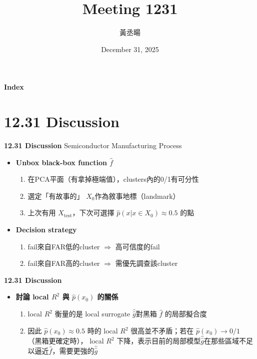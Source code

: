 \documentclass[12pt,aspectratio=43]{beamer}
\title{Meeting 1231}
\author{黃丞暘}
\institute{國立東華大學應數統計所}
\date{December 31, 2025}
\begin{document}
\begin{frame}
  \titlepage
\end{frame}

\begin{frame}{\textbf{Index}}
  \tableofcontents
\end{frame}

\section{12.31 Discussion}

\begin{frame}{\textbf{12.31 Discussion}}
\linespread{1.5}
Semiconductor Manufacturing Process

  \begin{itemize}
    \item \textbf{Unbox black-box function $\hat f$}
    \begin{enumerate}[]
      \item 在PCA平面（有拿掉極端值），clusters內的0/1有可分性  
      \item 選定「有故事的」 $X_0$作為敘事地標（landmark）
      \item 上次有用 $X_{\text{test}}$，下次可選擇 $\hat p(x|x \in X_0)\approx 0.5$ 的點
    \end{enumerate}

    \item \textbf{Decision strategy}
    \begin{enumerate}[]
      \item fail來自FAR低的cluster $\Rightarrow$ 高可信度的fail
      \item fail來自FAR高的cluster $\Rightarrow$ 需優先調查該cluster
    \end{enumerate}
  \end{itemize}
\end{frame}

\begin{frame}{\textbf{12.31 Discussion}}
\linespread{1.5}

\begin{itemize}
  \item \textbf{討論 local $R^2$ 與 $\hat p(x_0)$ 的關係}
  \begin{enumerate}[]
    \item local $R^2$ 衡量的是 local surrogate $\hat{\hat{g}}$對黑箱 $\hat f$ 的局部擬合度
    \item 因此 $\hat p(x_0)\approx 0.5$ 時的 local $R^2$ 很高並不矛盾；若在 $\hat p(x_0)\to 0/1$ （黑箱更確定時）， local $R^2$ 下降，表示目前的局部模型$\hat{\hat{g}}$在那些區域不足以逼近$\hat{f}$，需要更強的$\hat{\hat{g}}$
  \end{enumerate}
\end{itemize}

\end{frame}
\end{document}
